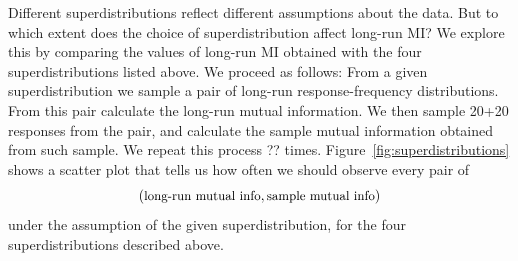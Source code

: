 Different superdistributions reflect different assumptions about the data. But to which extent does the choice of superdistribution affect long-run MI? We explore this by comparing the values of long-run MI obtained with the four superdistributions listed above. We proceed as follows: From a given superdistribution we sample a pair of long-run response-frequency distributions. From this pair calculate the long-run mutual information. We then sample 20+20 responses from the pair, and calculate the sample mutual information obtained from such sample. We repeat this process ?? times. Figure~\ref{fig:superdistributions}  shows a scatter plot that tells us how often we should observe every pair of \[(\text{\small long-run mutual info},
\text{\small sample mutual info})\] under the assumption of the given superdistribution, for the four superdistributions described above. 

